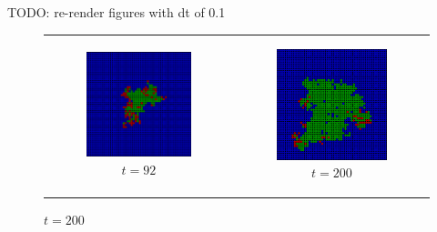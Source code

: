 TODO: re-render figures with dt of 0.1
\begin{figure}
\begin{center}
	\begin{tabular}{c c}
		\begin{subfigure}[b]{0.4\textwidth}
			\centering
			\includegraphics[width=.6\textwidth, angle=0]{./../shared/fig/spatial/SIR_spatial_52x52_92time.png}
			\caption{$t = 92$}
			\label{fig:sir_spatial_92}
		\end{subfigure}

		& 

		\begin{subfigure}[b]{0.4\textwidth}
			\centering
			\includegraphics[width=.6\textwidth, angle=0]{./../shared/fig/spatial/SIR_spatial_52x52_200time.png}
			\caption{$t = 200$}
			\label{fig:sir_spatial_200}
		\end{subfigure}

		\\
		

\end{tabular}
\end{center}
\end{figure}
